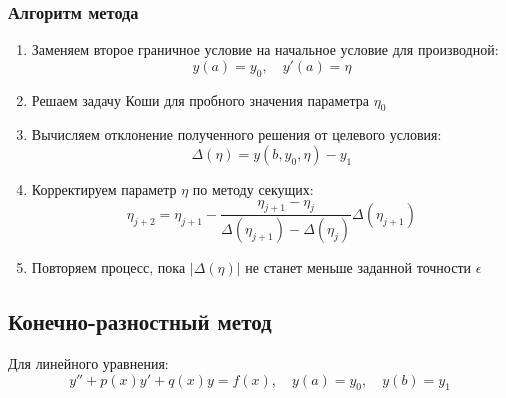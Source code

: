 \subsubsection*{Алгоритм метода}
\begin{enumerate}
    \item Заменяем второе граничное условие на начальное условие для производной:
    \begin{equation}
        y(a) = y_0, \quad y'(a) = \eta
        \label{eq:initial_condition}
    \end{equation}
    
    \item Решаем задачу Коши для пробного значения параметра $\eta_0$
    
    \item Вычисляем отклонение полученного решения от целевого условия:
    \begin{equation}
        \Delta(\eta) = y(b, y_0, \eta) - y_1
        \label{eq:deviation}
    \end{equation}
    
    \item Корректируем параметр $\eta$ по методу секущих:
    \begin{equation}
        \eta_{j+2} = \eta_{j+1} - \frac{\eta_{j+1} - \eta_j}{\Delta(\eta_{j+1}) - \Delta(\eta_j)} \Delta(\eta_{j+1})
        \label{eq:secant_method}
    \end{equation}
    
    \item Повторяем процесс, пока $|\Delta(\eta)|$ не станет меньше заданной точности $\epsilon$
\end{enumerate}


\subsection*{Конечно-разностный метод}
Для линейного уравнения:
\begin{equation}
    y'' + p(x)y' + q(x)y = f(x), \quad y(a)=y_0, \quad y(b)=y_1
    \tag{4.35-4.36}
\end{equation}

